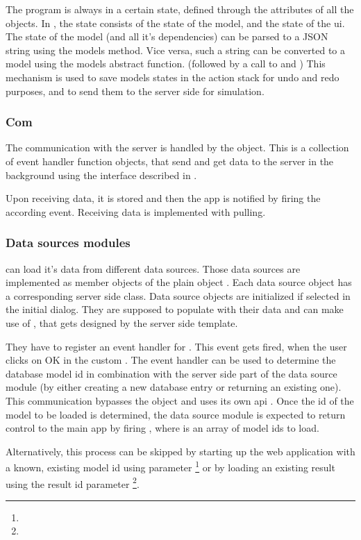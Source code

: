 

The program is always in a certain state, defined through the attributes of all the objects.
In \spl, the state consists of the state of the model, and the state of the ui.
The state of the model (and all it's dependencies) can be parsed to a JSON string using the models  method.
Vice versa, such a string can be converted to a model using the models abstract  function. (followed by a call to  and )
This mechanism is used to save models states in the action stack for undo and redo purposes, and to send them to the server side for simulation.



\subsubsection{Com}
The communication with the server is handled by the  object.
This is a collection of event handler function objects, that send and get data to the server in the background using the interface described in .

Upon receiving data, it is stored and then the app is notified by firing the according event. Receiving data is implemented with pulling.


\subsubsection{Data sources modules}

\spl can load it's data from different data sources.
Those data sources are implemented as member objects of the plain object .
Each data source object has a corresponding server side class.
Data source objects are initialized if selected in the initial dialog.
They are supposed to populate  with their data and can make use of , that gets designed by the server side template.

They have to register an event handler for .
This event gets fired, when the user clicks on OK in the custom .
The event handler can be used to determine the database model id in combination with the server side part of the data source module (by either creating a new database entry or returning an existing one). This communication bypasses the  object and uses its own api .
Once the id of the model to be loaded is determined, the data source module is expected to return control to the main app by firing , where  is an array of model ids to load.

Alternatively, this process can be skipped by starting up the web application with a known, existing model id using  parameter \footnote{\splurl[?mid=42]} or by loading an existing result using the result id  parameter \footnote{\splurl[?rid=1337]}.



